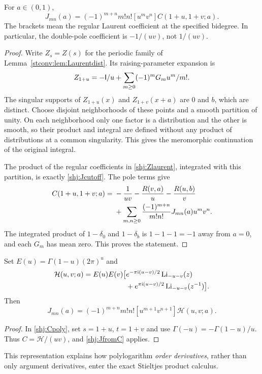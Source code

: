 \begin{proposition}\label{shj:Jcoefficient}
For $a\in(0,1)$,
\begin{equation}\label{shj:JfromC}
J_{mn}(a)=(-1)^{m+n}m!n![u^m v^n]C(1+u,1+v;a).
\end{equation}
The brackets mean the regular Laurent coefficient at the specified bidegree. In particular, the double-pole coefficient is $-1/(uv)$, not $1/(uv)$.
\end{proposition}
\begin{proof}
Write $Z_s=Z(s)$ for the periodic family of
Lemma~\ref{stconv:lem:Laurentdist}. Its raising-parameter expansion is
\begin{equation}\label{shj:Zlaurent}
 Z_{1+u}=-\mathsf I/u+\sum_{m\ge0}(-1)^mG_m u^m/m!.
\end{equation}
The singular supports of $Z_{1+u}(x)$ and $Z_{1+v}(x+a)$ are $0$ and $b$, which are distinct. Choose disjoint neighborhoods of these points and a smooth partition of unity. On each neighborhood only one factor is a distribution and the other is smooth, so their product and integral are defined without any product of distributions at a common singularity. This gives the meromorphic continuation of the original integral.

The product of the regular coefficients in \eqref{shj:Zlaurent}, integrated with this partition, is exactly \eqref{shj:Jcutoff}. The pole terms give
\begin{align}
C(1+u,1+v;a)={}&-\frac1{uv}-\frac{R(v,a)}u-\frac{R(u,b)}v\notag\\
&+\sum_{m,n\ge0}\frac{(-1)^{m+n}}{m!n!}J_{mn}(a)u^mv^n.
\label{shj:fullLaurent}
\end{align}
The integrated product of $1-\delta_0$ and $1-\delta_b$ is $1-1-1=-1$ away from $a=0$, and each $G_m$ has mean zero. This proves the statement.
\end{proof}

\begin{corollary}\label{shj:polygen}
Set $E(u)=\Gamma(1-u)(2\pi)^u$ and
\begin{align}
\mathcal H(u,v;a)=E(u)E(v)\big[&e^{-\pi\mathrm{i}(u-v)/2}\operatorname{Li}_{-u-v}(z)\notag\\
&+e^{\pi\mathrm{i}(u-v)/2}\operatorname{Li}_{-u-v}(z^{-1})\big].
\label{shj:H}
\end{align}
Then
\begin{equation}\label{shj:Jpoly}
J_{mn}(a)=(-1)^{m+n}m!n![u^{m+1}v^{n+1}]\mathcal H(u,v;a).
\end{equation}
\end{corollary}
\begin{proof}
In \eqref{shj:Cpoly}, set $s=1+u$, $t=1+v$ and use $\Gamma(-u)=-\Gamma(1-u)/u$. Thus $C=\mathcal H/(uv)$, and \eqref{shj:JfromC} applies.
\end{proof}
This representation explains how polylogarithm \emph{order derivatives}, rather than only argument derivatives, enter the exact Stieltjes product calculus.

